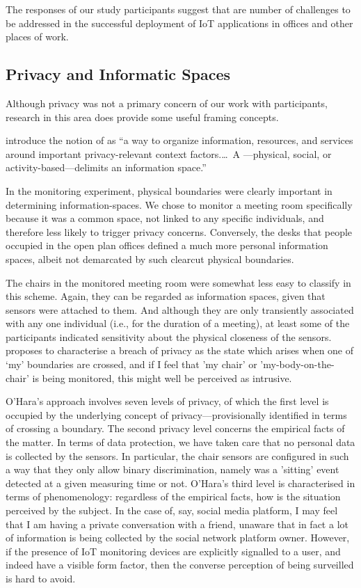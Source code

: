 The responses of our study participants
suggest that are number of challenges to be addressed in
the successful deployment of IoT applications in offices and other
places of work.

\subsection{Privacy and Informatic Spaces}
\label{sec:privacy}

Although privacy was not a primary concern of our work with
participants, research in this area does provide some useful framing
concepts.

\cite{Jiang-2002-MPCI} introduce the notion of  as ``a way to organize information, resources, and services
  around important privacy-relevant context factors.\ldots\  A
  ---physical, social, or activity-based---delimits an
  information space.''

In the monitoring experiment, physical boundaries were clearly
important in determining information-spaces. We chose to monitor a meeting room
specifically because it was a common space, not linked to any specific
individuals, and therefore less likely to trigger privacy
concerns. Conversely, the desks that people occupied in the open plan
offices defined a much more personal information spaces, albeit not
demarcated by such clearcut physical boundaries. 

The chairs in the monitored meeting room were somewhat less easy to
classify in this scheme. Again, they can be regarded as information
spaces, given that sensors were attached to them. And although they
are only transiently associated with any one individual (i.e., for the
duration of a meeting), at least some of the participants indicated
sensitivity about the physical closeness of the
sensors. \cite{Ohara-2016-TSVP} proposes to characterise a breach of privacy as
the state which arises when one of `my' boundaries are crossed, and if
I feel that 'my chair' or 'my-body-on-the-chair' is being monitored,
this might well be perceived as intrusive. 

O'Hara's \cite{Ohara-2016-TSVP}  approach involves seven levels of
privacy, of which the first level is occupied by the underlying concept of privacy---provisionally
identified in terms of crossing a boundary. The second privacy level concerns
the empirical facts of the matter. In terms of data protection, we
have taken care that no personal data is collected by the sensors. In
particular, the chair sensors are configured in such a way that they only allow binary
discrimination, namely was a 'sitting' event detected at a given
measuring time or not. O'Hara's third level is characterised in terms
of phenomenology: regardless of the empirical facts, how is the
situation perceived by the subject. In the case of, say, social media
platform, I may feel that I am having a private conversation with a
friend, unaware that in fact a lot of information is being collected
by the social network platform owner. However, if the presence of IoT monitoring
devices are explicitly signalled to a user, and indeed have a visible
form factor, then the converse perception of being surveilled is hard
to avoid.

